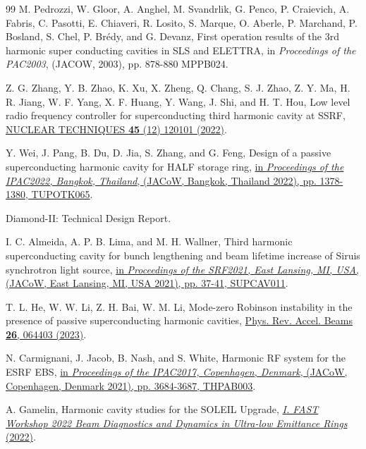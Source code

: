 \documentclass[%
 reprint,
 amsmath,amssymb,
 aps,
]{revtex4-1}
\begin{document}
\begin{thebibliography}{99}
M. Pedrozzi, W. Gloor, A. Anghel, M. Svandrlik, G. Penco, P. Craievich, A. Fabris, C. Pasotti, E. Chiaveri, R. Losito, S. Marque, O. Aberle, P. Marchand, P. Bosland, S. Chel, P. Br{\'{e}}dy, and G. Devanz, First operation results of the 3rd harmonic super conducting cavities in SLS and ELETTRA, in \emph{Proceedings of the PAC2003}, (JACOW, 2003), pp. 878-880 MPPB024.

 Z. G. Zhang, Y. B. Zhao, K. Xu, X. Zheng, Q. Chang, S. J. Zhao, Z. Y. Ma, H. R. Jiang, W. F. Yang, X. F. Huang, Y. Wang, J. Shi, and H. T. Hou, Low level radio frequency controller for superconducting third harmonic cavity at SSRF, \href{http://www.hjs.sinap.ac.cn/thesisDetails#10.11889/j.0253-3219.2022.hjs.45.120101&lang=zh}{NUCLEAR TECHNIQUES {\bf 45} (12) 120101 (2022)}.

Y. Wei, J. Pang, B. Du, D. Jia, S. Zhang, and G. Feng, Design of a passive superconducting harmonic cavity for HALF storage ring, \href{https://accelconf.web.cern.ch/ipac2022/papers/tupotk065.pdf}{in \emph{Proceedings of the IPAC2022, Bangkok, Thailand}, (JACoW, Bangkok, Thailand 2022), pp. 1378-1380, TUPOTK065}.

Diamond-II: Technical Design Report.

I. C. Almeida, A. P. B. Lima, and M. H. Wallner, Third harmonic superconducting cavity for bunch lengthening and beam lifetime increase of Siruis synchrotron light source, \href{https://accelconf.web.cern.ch/srf2021/papers/supcav011.pdf}{in \emph{Proceedings of the SRF2021, East Lansing, MI, USA}, (JACoW, East Lansing, MI, USA 2021), pp. 37-41, SUPCAV011}.

T. L. He, W. W. Li, Z. H. Bai, W. M. Li, Mode-zero Robinson instability in the presence of passive superconducting harmonic cavities, \href{https://link.aps.org/doi/10.1103/PhysRevAccelBeams.26.064403}{Phys. Rev. Accel. Beams {\bf 26}, 064403 (2023)}.

N. Carmignani, J. Jacob, B. Nash,  and S. White, Harmonic RF system for the ESRF EBS, \href{https://accelconf.web.cern.ch/ipac2017/papers/thpab003.pdf}{in \emph{Proceedings of the IPAC2017, Copenhagen, Denmark}, (JACoW, Copenhagen, Denmark 2021), pp. 3684-3687, THPAB003}.

A. Gamelin, Harmonic cavity studies for the SOLEIL Upgrade, \href{https://indico.scc.kit.edu/event/2592/sessions/2579/attachments/5006/7591/Slides_3-1_Gamelin.pdf}{\emph{I. FAST Workshop 2022 Beam Diagnostics and Dynamics in Ultra-low Emittance Rings} (2022)}.


\end{thebibliography}
\end{document}
